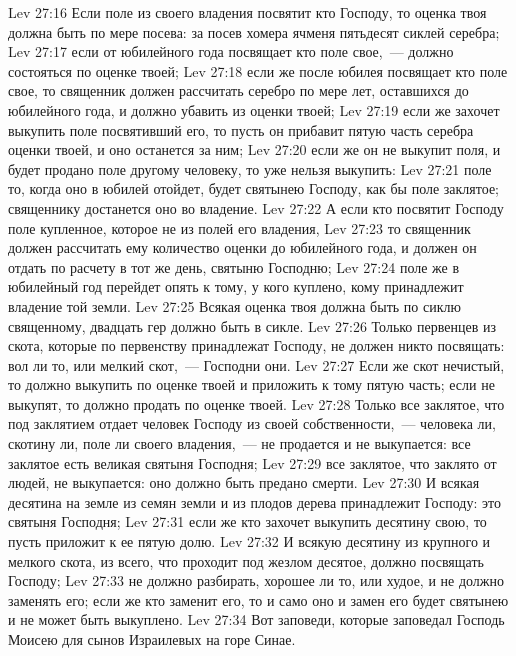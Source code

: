 \vs Lev 27:16 Если поле из своего владения посвятит кто Господу, то оценка твоя должна быть по мере посева: за посев хомера ячменя пятьдесят сиклей серебра;
\vs Lev 27:17 если от юбилейного года посвящает кто поле свое,~--- должно состояться по оценке твоей;
\vs Lev 27:18 если же после юбилея посвящает кто поле свое, то священник должен рассчитать серебро по мере лет, оставшихся до юбилейного года, и должно убавить из оценки твоей;
\vs Lev 27:19 если же захочет выкупить поле посвятивший его, то пусть он прибавит пятую часть серебра оценки твоей, и оно останется за ним;
\vs Lev 27:20 если же он не выкупит поля, и будет продано поле другому человеку, то уже нельзя выкупить:
\vs Lev 27:21 поле то, когда оно в юбилей отойдет, будет святынею Господу, как бы поле заклятое; священнику достанется оно во владение.
\vs Lev 27:22 А если кто посвятит Господу поле купленное, которое не из полей его владения,
\vs Lev 27:23 то священник должен рассчитать ему количество оценки до юбилейного года, и должен он отдать по расчету в тот же день,  святыню Господню;
\vs Lev 27:24 поле же в юбилейный год перейдет опять к тому, у кого куплено, кому принадлежит владение той земли.
\vs Lev 27:25 Всякая оценка твоя должна быть по сиклю священному, двадцать гер должно быть в сикле.
\vs Lev 27:26 Только первенцев из скота, которые по первенству принадлежат Господу, не должен никто посвящать: вол ли то, или мелкий скот,~--- Господни они.
\vs Lev 27:27 Если же скот нечистый, то должно выкупить по оценке твоей и приложить к тому пятую часть; если не выкупят, то должно продать по оценке твоей.
\vs Lev 27:28 Только все заклятое, что под заклятием отдает человек Господу из своей собственности,~--- человека ли, скотину ли, поле ли своего владения,~--- не продается и не выкупается: все заклятое есть великая святыня Господня;
\vs Lev 27:29 все заклятое, что заклято от людей, не выкупается: оно должно быть предано смерти.
\vs Lev 27:30 И всякая десятина на земле из семян земли и из плодов дерева принадлежит Господу: это святыня Господня;
\vs Lev 27:31 если же кто захочет выкупить десятину свою, то пусть приложит к  ее пятую долю.
\vs Lev 27:32 И всякую десятину из крупного и мелкого скота, из всего, что проходит под жезлом десятое, должно посвящать Господу;
\vs Lev 27:33 не должно разбирать, хорошее ли то, или худое, и не должно заменять его; если же кто заменит его, то и само оно и замен его будет святынею и не может быть выкуплено.
\rsbpar\vs Lev 27:34 Вот заповеди, которые заповедал Господь Моисею для сынов Израилевых на горе Синае.
